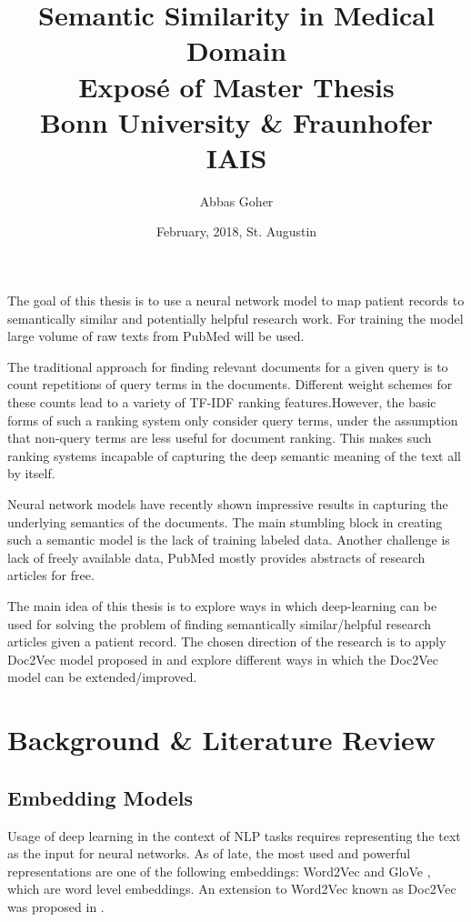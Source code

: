 \documentclass[12pt,a4paper] {article}
\begin{document}
\title{Semantic Similarity in Medical Domain \\ \hphantom \newline
	\large 	Expos\'{e} of Master Thesis
	\\Bonn University \& Fraunhofer IAIS}
\author{Abbas Goher}
\date{February, 2018, St. Augustin}
\maketitle
 
The goal of this thesis is to use a neural network model to map patient records to semantically similar and potentially helpful research work. For training the model large volume of raw texts from PubMed \cite{pubmed}  will be used.


The traditional approach for finding relevant documents for a given query is to count repetitions of query terms in the documents. Different weight schemes for these counts lead to a variety of TF-IDF ranking features.However, the basic forms of such a ranking system only consider query terms, under the assumption that non-query terms are less useful for document ranking. This makes such ranking systems incapable of capturing the deep semantic meaning of the text all by itself. 

Neural network models have recently shown impressive results in capturing the underlying semantics of the documents\cite{Bengio2006}.
The main stumbling block in creating such a semantic model is the lack of training labeled data. Another challenge is lack of freely available data, PubMed mostly provides abstracts of research articles for free. 

The main idea of this thesis is to explore ways in which deep-learning can be used for solving the problem of finding semantically similar/helpful research articles given a patient record. The chosen direction of the research is to apply Doc2Vec model proposed in \cite{le2014distributed} and explore different ways in which the Doc2Vec model can be extended/improved.

\section*{Background \& Literature Review}

\subsection*{Embedding Models}
Usage of deep learning in the context of NLP tasks requires representing the text as the input for neural networks. As of late, the most used and powerful representations are one of the following embeddings: Word2Vec \cite{mikolov2013efficient} and GloVe \cite{pennington2014glove}, which are word level embeddings. An extension to Word2Vec known as Doc2Vec was proposed in \cite{le2014distributed}.  
\end{document}
